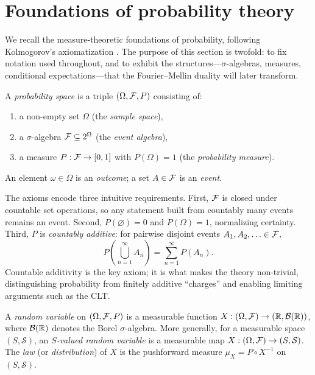 \section{Foundations of probability theory}\label{sec:probability}

We recall the measure-theoretic foundations of probability, following Kolmogorov's axiomatization \cite{Billingsley,Durrett}. The purpose of this section is twofold: to fix notation used throughout, and to exhibit the structures---$\sigma$-algebras, measures, conditional expectations---that the Fourier--Mellin duality will later transform.

\begin{definition}\label{def:prob-space}
A \emph{probability space} is a triple $(\Omega, \mathcal{F}, P)$ consisting of:
\begin{enumerate}[label=(\roman*)]
\item a non-empty set $\Omega$ (the \emph{sample space}),
\item a $\sigma$-algebra $\mathcal{F} \subseteq 2^\Omega$ (the \emph{event algebra}),
\item a measure $P : \mathcal{F} \to [0,1]$ with $P(\Omega) = 1$ (the \emph{probability measure}).
\end{enumerate}
An element $\omega \in \Omega$ is an \emph{outcome}; a set $A \in \mathcal{F}$ is an \emph{event}.
\end{definition}

\begin{remark}
The axioms encode three intuitive requirements. First, $\mathcal{F}$ is closed under countable set operations, so any statement built from countably many events remains an event. Second, $P(\varnothing) = 0$ and $P(\Omega) = 1$, normalizing certainty. Third, $P$ is \emph{countably additive}: for pairwise disjoint events $A_1, A_2, \ldots \in \mathcal{F}$,
\[
P\!\left(\bigcup_{n=1}^\infty A_n\right) = \sum_{n=1}^\infty P(A_n).
\]
Countable additivity is the key axiom; it is what makes the theory non-trivial, distinguishing probability from finitely additive ``charges'' and enabling limiting arguments such as the CLT.
\end{remark}

\begin{definition}\label{def:rv}
A \emph{random variable} on $(\Omega, \mathcal{F}, P)$ is a measurable function $X : (\Omega, \mathcal{F}) \to (\mathbb{R}, \mathcal{B}(\mathbb{R}))$, where $\mathcal{B}(\mathbb{R})$ denotes the Borel $\sigma$-algebra. More generally, for a measurable space $(S, \mathcal{S})$, an \emph{$S$-valued random variable} is a measurable map $X : (\Omega, \mathcal{F}) \to (S, \mathcal{S})$. The \emph{law} (or \emph{distribution}) of $X$ is the pushforward measure $\mu_X = P \circ X^{-1}$ on $(S, \mathcal{S})$.
\end{definition}

